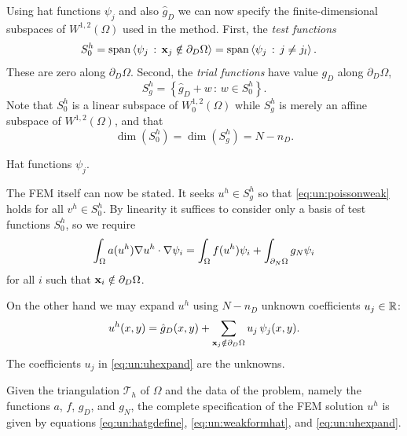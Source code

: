 Using hat functions $\psi_j$ and also $\hat g_D$ we can now specify the finite-dimensional subspaces of $W^{1,2}(\Omega)$ used in the method.  First, the \emph{test functions}
\begin{align*}
S_{0}^h &= \operatorname{span}\left<\psi_j \,:\, \mathbf{x}_j \notin \partial_D \Omega\right> = \operatorname{span}\left<\psi_j \,:\, j \neq j_l\right>.
\end{align*}
These are zero along $\partial_D \Omega$.  Second, the \emph{trial functions} have value $g_D$ along $\partial_D \Omega$,
\begin{equation}
S_{g}^h = \left\{\hat g_D + w \,:\, w \in S_{0}^h\right\}.
\end{equation}
Note that $S_{0}^h$ is a linear subspace of $W^{1,2}_0(\Omega)$ while $S_{g}^h$ is merely an affine subspace of $W^{1,2}(\Omega)$, and that
\begin{equation}
\dim(S_{0}^h)=\dim(S_{g}^h)=N-n_D.
\end{equation}

\begin{marginfigure}

\caption{Hat functions $\psi_j$.}
\label{fig:un:hatfunction}
\end{marginfigure}

The FEM itself can now be stated.  It seeks $u^h\in S_{g}^h$ so that \eqref{eq:un:poissonweak} holds for all $v^h\in S_{0}^h$.  By linearity it suffices to consider only a basis of test functions $S_{0}^h$, so we require
\begin{equation}
\int_\Omega a(u^h) \nabla u^h \cdot \nabla \psi_i = \int_\Omega f(u^h) \psi_i + \int_{\partial_N\Omega} g_N \psi_i \label{eq:un:weakformhat}
\end{equation}
for all $i$ such that $\mathbf{x}_i \notin \partial_D \Omega$.

On the other hand we may expand $u^h$ using $N-n_D$ unknown coefficients $u_j\in\mathbb{R}$:
\begin{equation}
u^h(x,y) = \hat g_D(x,y) + \sum_{\mathbf{x}_j \notin \partial_D \Omega} u_j\, \psi_j(x,y). \label{eq:un:uhexpand}
\end{equation}
The coefficients $u_j$ in \eqref{eq:un:uhexpand} are the unknowns.

Given the triangulation $\mathcal{T}_h$ of $\Omega$ and the data of the problem, namely the functions $a$, $f$, $g_D$, and $g_N$, the complete specification of the FEM solution $u^h$ is given by equations \eqref{eq:un:hatgdefine}, \eqref{eq:un:weakformhat}, and \eqref{eq:un:uhexpand}.

